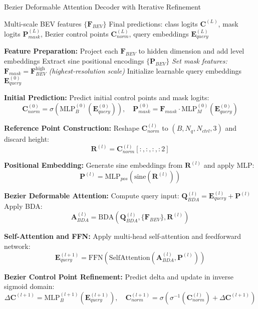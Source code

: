\begin{algorithm}[t]
\scriptsize
\caption{Bezier Deformable Attention Decoder with Iterative Refinement}
\label{sup_alg: topobda}
\begin{algorithmic}[1]
\REQUIRE Multi-scale BEV features $\{\mathbf{F}_{BEV}\}$
\ENSURE Final predictions: class logits $\mathbf{C}^{(L)}$, mask logits $\mathbf{P}_{mask}^{(L)}$, Bezier control points $\mathbf{C}_{norm}^{(L)}$, query embeddings $\mathbf{E}_{query}^{(L)}$

\STATE \textbf{Feature Preparation:}
\STATE \quad Project each $\mathbf{F}_{BEV}$ to hidden dimension and add level embeddings
\STATE \quad Extract sine positional encodings $\{\mathbf{P}_{BEV}\}$
\STATE \quad \textit{\scriptsize Set mask features: $\mathbf{F}_{mask} = \mathbf{F}_{BEV}^{\text{high}}$ (highest-resolution scale)}
\STATE \quad Initialize learnable query embeddings $\mathbf{E}_{query}^{(0)}$

\STATE \textbf{Initial Prediction:}
\STATE \quad Predict initial control points and mask logits:
\[
\mathbf{C}_{norm}^{(0)} = \sigma(\text{MLP}_B^{(0)}(\mathbf{E}_{query}^{(0)})), \quad
\mathbf{P}_{mask}^{(0)} = \mathbf{F}_{mask} \cdot \text{MLP}_M^{(0)}(\mathbf{E}_{query}^{(0)})
\]

    \STATE \textbf{Reference Point Construction:}
    \STATE \quad Reshape $\mathbf{C}_{norm}^{(l)}$ to $(B, N_q, N_{ctrl}, 3)$ and discard height:
    \[
    \mathbf{R}^{(l)} = \mathbf{C}_{norm}^{(l)}[:, :, :, :2]
    \]

    \STATE \textbf{Positional Embedding:}
    \STATE \quad Generate sine embeddings from $\mathbf{R}^{(l)}$ and apply MLP:
    \[
    \mathbf{P}^{(l)} = \text{MLP}_{pos}(\text{sine}(\mathbf{R}^{(l)}))
    \]

    \STATE \textbf{Bezier Deformable Attention:}
    \STATE \quad Compute query input: $\mathbf{Q}_{BDA}^{(l)} = \mathbf{E}_{query}^{(l)} + \mathbf{P}^{(l)}$
    \STATE \quad Apply BDA:
    \[
    \mathbf{A}_{BDA}^{(l)} = \text{BDA}(\mathbf{Q}_{BDA}^{(l)}, \{\mathbf{F}_{BEV}\}, \mathbf{R}^{(l)})
    \]

    \STATE \textbf{Self-Attention and FFN:}
    \STATE \quad Apply multi-head self-attention and feedforward network:
    \[
    \mathbf{E}_{query}^{(l+1)} = \text{FFN}(\text{SelfAttention}(\mathbf{A}_{BDA}^{(l)}, \mathbf{P}^{(l)}))
    \]

    \STATE \textbf{Bezier Control Point Refinement:}
    \STATE \quad Predict delta and update in inverse sigmoid domain:
    \[
    \Delta \mathbf{C}^{(l+1)} = \text{MLP}_B^{(l+1)}(\mathbf{E}_{query}^{(l+1)}), \quad
    \mathbf{C}_{norm}^{(l+1)} = \sigma(\sigma^{-1}(\mathbf{C}_{norm}^{(l)}) + \Delta \mathbf{C}^{(l+1)})
    \]


\end{algorithmic}
\end{algorithm}
